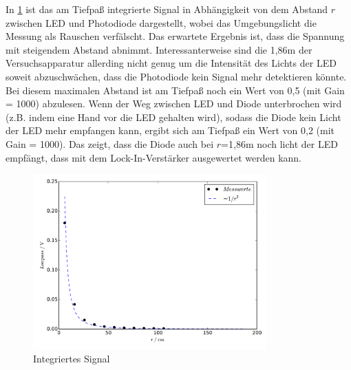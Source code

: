 In \ref{fig:plot4} ist das am Tiefpaß integrierte Signal in Abhängigkeit von
dem Abstand $r$ zwischen LED und Photodiode dargestellt, wobei das Umgebungslicht
die Messung als Rauschen verfälscht. Das erwartete Ergebnis
ist, dass die Spannung mit steigendem Abstand abnimmt. Interessanterweise
sind die 1,86m der Versuchsapparatur allerding nicht genug um die Intensität
des Lichts der LED soweit abzuschwächen, dass die Photodiode kein Signal
mehr detektieren könnte. Bei diesem maximalen Abstand ist am Tiefpaß noch ein
Wert von 0,5 (mit Gain = 1000) abzulesen. Wenn der Weg zwischen LED und
Diode unterbrochen wird (z.B. indem eine Hand vor die LED gehalten wird),
sodass die Diode kein Licht der LED mehr empfangen kann, ergibt sich am
Tiefpaß ein Wert von 0,2 (mit Gain = 1000). Das zeigt, dass die Diode auch
bei $r$=1,86m noch licht der LED empfängt, dass mit dem Lock-In-Verstärker
ausgewertet werden kann.
\begin{figure}
  \centering
  \includegraphics[width=0.8\textwidth, height=0.5\textwidth]{plot4.pdf}
  \caption{Integriertes Signal}
  \label{fig:plot4}
\end{figure}
